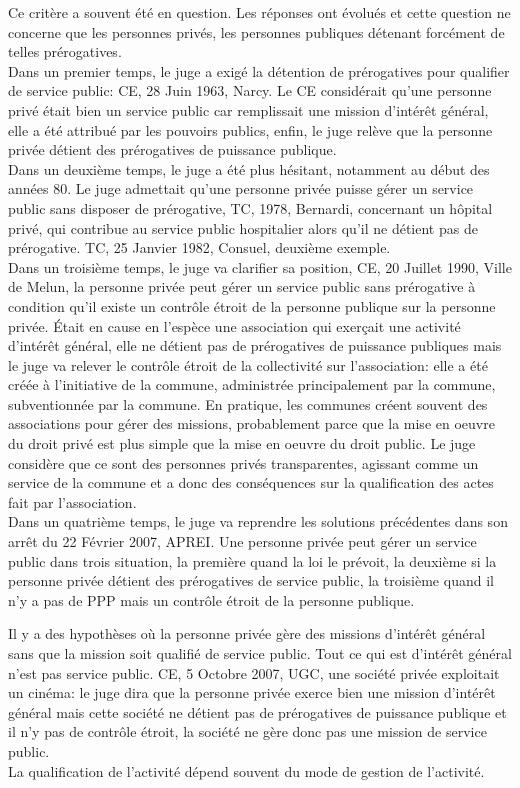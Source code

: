 \documentclass[10pt, a4paper, openany]{book}
\begin{document}
Ce critère a souvent été en question. Les réponses ont évolués et cette question ne concerne que les personnes privés, les personnes publiques détenant forcément de telles prérogatives. \\
Dans un premier temps, le juge a exigé la détention de prérogatives pour qualifier de service public: CE, 28 Juin 1963, Narcy. Le CE considérait qu'une personne privé était bien un service public car remplissait une mission d'intérêt général, elle a été attribué par les pouvoirs publics, enfin, le juge relève que la personne privée détient des prérogatives de puissance publique. \\
Dans un deuxième temps, le juge a été plus hésitant, notamment au début des années 80. Le juge admettait qu'une personne privée puisse gérer un service public sans disposer de prérogative, TC, 1978, Bernardi, concernant un hôpital privé, qui contribue au service public hospitalier alors qu'il ne détient pas de prérogative. TC, 25 Janvier 1982, Consuel, deuxième exemple. \\
Dans un troisième temps, le juge va clarifier sa position, CE, 20 Juillet 1990, Ville de Melun, la personne privée peut gérer un service public sans prérogative à condition qu'il existe un contrôle étroit de la personne publique sur la personne privée. Était en cause en l'espèce une association qui exerçait une activité d'intérêt général, elle ne détient pas de prérogatives de puissance publiques mais le juge va relever le contrôle étroit de la collectivité sur l'association: elle a été créée à l'initiative de la commune, administrée principalement par la commune, subventionnée par la commune. En pratique, les communes créent souvent des associations pour gérer des missions, probablement parce que la mise en oeuvre du droit privé est plus simple que la mise en oeuvre du droit public. Le juge considère que ce sont des personnes privés transparentes, agissant comme un service de la commune et a donc des conséquences sur la qualification des actes fait par l'association. \\
Dans un quatrième temps, le juge va reprendre les solutions précédentes dans son arrêt du 22 Février 2007, APREI. Une personne privée peut gérer un service public dans trois situation, la première quand la loi le prévoit, la deuxième si la personne privée détient des prérogatives de service public, la troisième quand il n'y a pas de PPP mais un contrôle étroit de la personne publique. 


Il y a des hypothèses où la personne privée gère des missions d'intérêt général sans que la mission soit qualifié de service public. Tout ce qui est d'intérêt général n'est pas service public. CE, 5 Octobre 2007, UGC, une société privée exploitait un cinéma: le juge dira que la personne privée exerce bien une mission d'intérêt général mais cette société ne détient pas de prérogatives de puissance publique et il n'y pas de contrôle étroit, la société ne gère donc pas une mission de service public. \\
La qualification de l'activité dépend souvent du mode de gestion de l'activité. 
\end{document}
